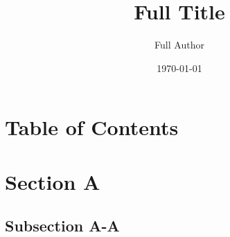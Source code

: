 \documentclass{beamer}
\begin{document}

\title[Short Title]{Full Title}
\author[Short Author]{Full Author}
\date{\today}
\frame{\titlepage}


\section*{Table of Contents}
\frame {
  \frametitle{\secname}
  \tableofcontents
}


\section{Section A}

\subsection{Subsection A-A}
\end{document}
